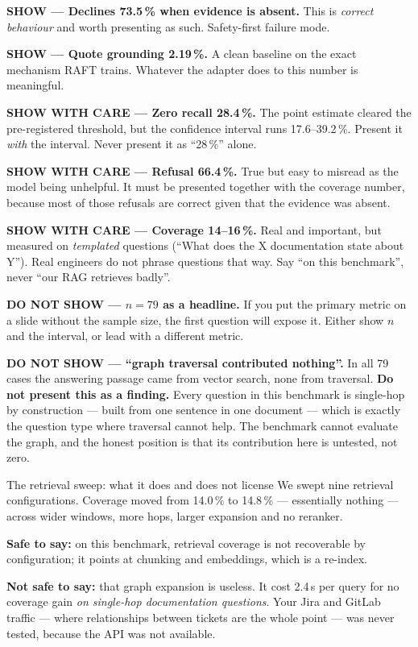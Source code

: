 \documentclass[11pt,a4paper]{article}
\newcommand{\SHOW}{\textcolor{good}{\textbf{SHOW}}}
\newcommand{\HIDE}{\textcolor{bad}{\textbf{DO NOT SHOW}}}
\newcommand{\CARE}{\textcolor{warn}{\textbf{SHOW WITH CARE}}}
\begin{document}
\textbf{\SHOW{} --- Declines 73.5\,\% when evidence is absent.} This is
\emph{correct behaviour} and worth presenting as such. Safety-first failure mode.

\textbf{\SHOW{} --- Quote grounding 2.19\,\%.} A clean baseline on the exact
mechanism RAFT trains. Whatever the adapter does to this number is meaningful.

\textbf{\CARE{} --- Zero recall 28.4\,\%.} The point estimate cleared the
pre-registered threshold, but the confidence interval runs 17.6--39.2\,\%. Present
it \emph{with} the interval. Never present it as ``28\,\%'' alone.

\textbf{\CARE{} --- Refusal 66.4\,\%.} True but easy to misread as the model being
unhelpful. It must be presented together with the coverage number, because most of
those refusals are correct given that the evidence was absent.

\textbf{\CARE{} --- Coverage 14--16\,\%.} Real and important, but measured on
\emph{templated} questions (``What does the X documentation state about Y''). Real
engineers do not phrase questions that way. Say ``on this benchmark'', never ``our
RAG retrieves badly''.

\textbf{\HIDE{} --- $n=79$ as a headline.} If you put the primary metric on a slide
without the sample size, the first question will expose it. Either show $n$ and the
interval, or lead with a different metric.

\textbf{\HIDE{} --- ``graph traversal contributed nothing''.} In all 79 cases the
answering passage came from vector search, none from traversal. \textbf{Do not
present this as a finding.} Every question in this benchmark is single-hop by
construction --- built from one sentence in one document --- which is exactly the
question type where traversal cannot help. The benchmark cannot evaluate the graph,
and the honest position is that its contribution here is untested, not zero.

\begin{warnbox}{{The retrieval sweep: what it does and does not license}}
We swept nine retrieval configurations. Coverage moved from 14.0\,\% to 14.8\,\% ---
essentially nothing --- across wider windows, more hops, larger expansion and no
reranker.

\textbf{Safe to say:} on this benchmark, retrieval coverage is not recoverable by
configuration; it points at chunking and embeddings, which is a re-index.

\textbf{Not safe to say:} that graph expansion is useless. It cost 2.4\,s per query
for no coverage gain \emph{on single-hop documentation questions}. Your Jira and
GitLab traffic --- where relationships between tickets are the whole point --- was
never tested, because the API was not available.
\end{warnbox}
\end{document}
